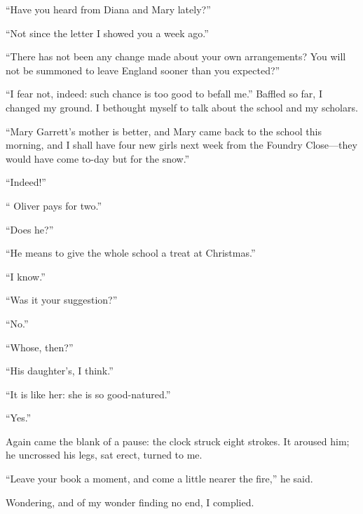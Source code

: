 \enquote{Have you heard from Diana and Mary lately?}

\enquote{Not since the letter I showed you a week ago.}

\enquote{There has not been any change made about your own
	arrangements? You will not be summoned to leave England sooner than you
	expected?}

\enquote{I fear not, indeed: such chance is too good to befall me.}
Baffled so far, I changed my ground. I bethought myself to talk about
the school and my scholars.

\enquote{Mary Garrett's mother is better, and Mary came back to the
	school this morning, and I shall have four new girls next week from the
	Foundry Close---they would have come to-day but for the snow.}

\enquote{Indeed!}

\enquote{\Mr{} Oliver pays for two.}

\enquote{Does he?}

\enquote{He means to give the whole school a treat at Christmas.}

\enquote{I know.}

\enquote{Was it your suggestion?}

\enquote{No.}

\enquote{Whose, then?}

\enquote{His daughter's, I think.}

\enquote{It is like her: she is so good-natured.}

\enquote{Yes.}

Again came the blank of a pause: the clock struck eight strokes. It
aroused him; he uncrossed his legs, sat erect, turned to me.

\enquote{Leave your book a moment, and come a little nearer the fire,}
he said.

Wondering, and of my wonder finding no end, I complied.

